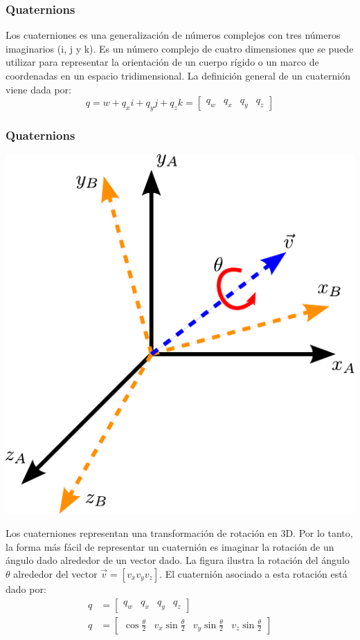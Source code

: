 \begin{frame}

\end{frame}

\begin{frame}
    \frametitle{Quaternions}
    Los cuaterniones es una generalización de números complejos con tres números imaginarios (i, j y k). Es un número complejo de cuatro dimensiones que se puede utilizar para representar la orientación de un cuerpo rígido o un marco de coordenadas en un espacio tridimensional. La definición general de un cuaternión viene dada por:
    \begin{equation*}
        q = w + q_x i + q_y j + q_z k = \begin{bmatrix} q_w & q_x & q_y & q_z\end{bmatrix}
    \end{equation*}
\end{frame}

\begin{frame}
    \frametitle{Quaternions}

    \begin{center}
        \includegraphics[width=0.2\columnwidth]{./images/quaternion.pdf}
    \end{center}

    Los cuaterniones representan una transformación de rotación en 3D. Por lo tanto, la forma más fácil de representar un cuaternión es imaginar la rotación de un ángulo dado alrededor de un vector dado. La figura ilustra la rotación del ángulo $\theta$ alrededor del vector $\vec{v} = [v_{x} v_{y} v_{z}]$. El cuaternión asociado a esta rotación está dado por:
    \begin{align*}
        q &= \begin{bmatrix} q_w & q_x & q_y & q_z\end{bmatrix}\\
        q &= \begin{bmatrix}
            \cos \frac{\theta}{2} & v_{x} \sin \frac{\theta}{2} & v_{y} \sin \frac{\theta}{2} & v_{z}\sin \frac{\theta}{2}
        \end{bmatrix}
    \end{align*}
\end{frame}

